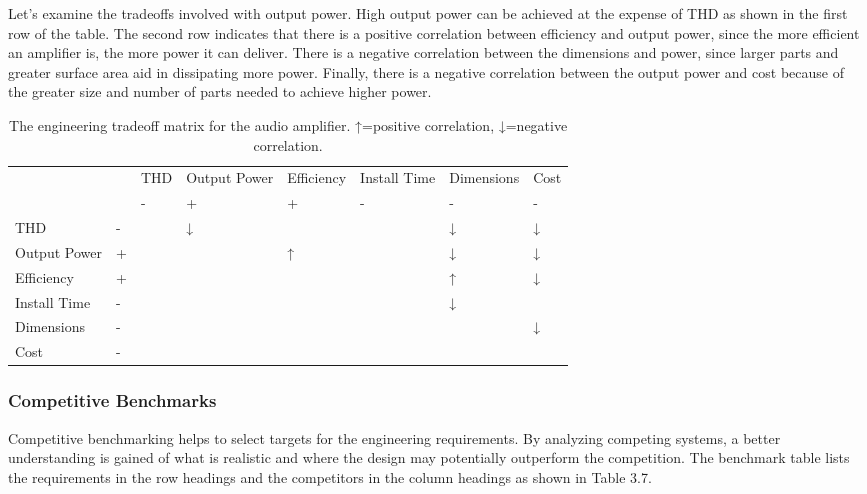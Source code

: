 Let's examine the tradeoffs involved with output power. High output
power can be achieved at the expense of THD as shown in the first row of
the table. The second row indicates that there is a positive correlation
between efficiency and output power, since the more efficient an
amplifier is, the more power it can deliver. There is a negative
correlation between the dimensions and power, since larger parts and
greater surface area aid in dissipating more power. Finally, there is a
negative correlation between the output power and cost because of the
greater size and number of parts needed to achieve higher power.

\begin{table}
\centering
\caption{The engineering tradeoff matrix for the audio
amplifier. ↑=positive correlation, ↓=negative correlation.}
\label{table:engTradeOff}

\begin{tabular}{ |l|l|l|l|l|l|l|l|} 
\hline
\rowcolor{Gray}
  &   & THD & Output Power & Efficiency & Install Time & Dimensions & Cost \\ 
 \rowcolor{Gray}
  &   &  -      &  +                     & +               & -                   & -                    &  - \\
THD & - & & ↓ & & & ↓ & ↓ \\
Output Power & + & & & ↑ & & ↓ & ↓ \\
Efficiency & + & & & & & ↑ & ↓ \\
Install Time & - & & & & & ↓ & \\
Dimensions & - & & & & & & ↓ \\
Cost & - & & & & & & \\
\end{tabular}
\end{table}

\subsubsection{Competitive Benchmarks}\label{competitive-benchmarks}

Competitive benchmarking helps to select targets for the engineering
requirements. By analyzing competing systems, a better understanding is
gained of what is realistic and where the design may potentially
outperform the competition. The benchmark table lists the requirements
in the row headings and the competitors in the column headings as shown
in Table 3.7.

